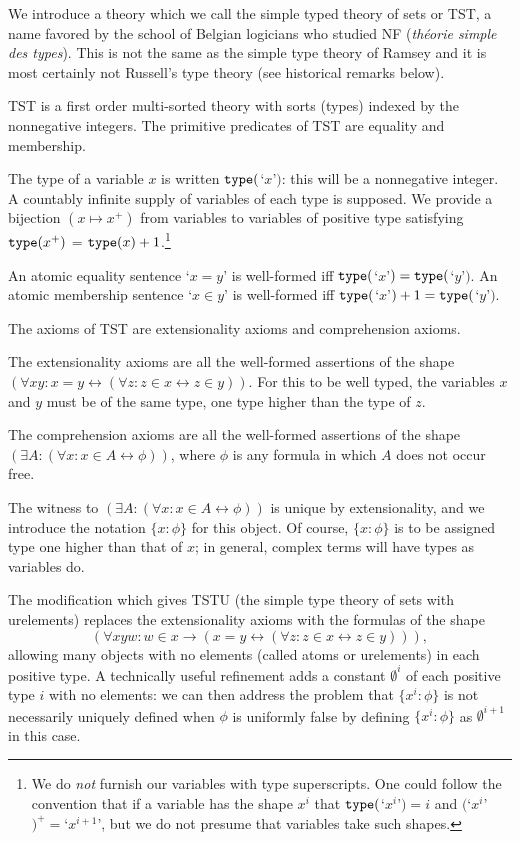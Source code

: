 \documentclass[112pt]{article}
\begin{document}
We introduce a theory which we call the simple typed theory of sets or TST, a name favored by the school of Belgian logicians who studied NF ({\em th\'eorie simple des types}).  This is not the same as the simple type theory of Ramsey and it is most certainly not Russell's type theory  (see historical remarks below).

TST is a first order multi-sorted theory with sorts (types) indexed by the nonnegative integers.  The primitive predicates of TST are equality and membership.

The type of a variable $x$ is written ${\tt type}($`$x$'$)$:  this will be a nonnegative integer.   A countably infinite supply of variables of each type is supposed.   We provide a bijection $(x \mapsto x^+)$ from variables to variables of positive type satisfying   ${\tt type}(x^+)$ = ${\tt type}(x)+1$.\footnote{We do {\em not\/} furnish our variables with type superscripts.  One could follow the convention that if a variable has the shape $x^i$ that ${\tt type}($`$x^i$'$) = i$ and $($`$x^i$'$)^+ = $`$x^{i+1}$', but we do not presume that variables take such shapes.}


 An atomic equality sentence `$x=y$' is well-formed iff ${\tt type}($`$x$'$)={\tt type}($`$y$'$)$. An atomic membership sentence `$x \in y$' is well-formed iff ${\tt type}($`$x$'$)+1 = {\tt type}($`$y$'$)$.

The axioms of TST are extensionality axioms and comprehension axioms.

The extensionality axioms are all the well-formed assertions of the shape $(\forall xy:x=y \leftrightarrow (\forall z:z \in x \leftrightarrow z\in y))$.  For this to be well typed, the variables
$x$ and $y$ must be of the same type, one type higher than the type of $z$.

The comprehension axioms are all the well-formed assertions of the shape $(\exists A:(\forall x:x \in A \leftrightarrow \phi))$, where $\phi$ is any formula in which $A$ does not occur free.

The witness to $(\exists A:(\forall x:x \in A \leftrightarrow \phi))$ is unique by extensionality, and we introduce the notation $\{x:\phi\}$ for this object.  Of course, $\{x:\phi\}$  is to be assigned type one higher than that of $x$;  in general, complex terms will have types as variables do.

The modification which gives TSTU (the simple type theory of sets with urelements) replaces the extensionality axioms with the formulas of the shape $$(\forall xyw:w \in x \rightarrow (x=y \leftrightarrow (\forall z:z \in x \leftrightarrow z\in y))),$$  allowing many objects with no elements (called atoms or urelements)  in each positive type.  A technically useful refinement adds a constant $\emptyset^i$ of each positive type $i$ with no elements:  we can then address the problem that $\{x^i:\phi\}$ is not necessarily  uniquely defined when $\phi$ is uniformly false by defining $\{x^i:\phi\}$ as $\emptyset^{i+1}$ in this case.
\end{document}
